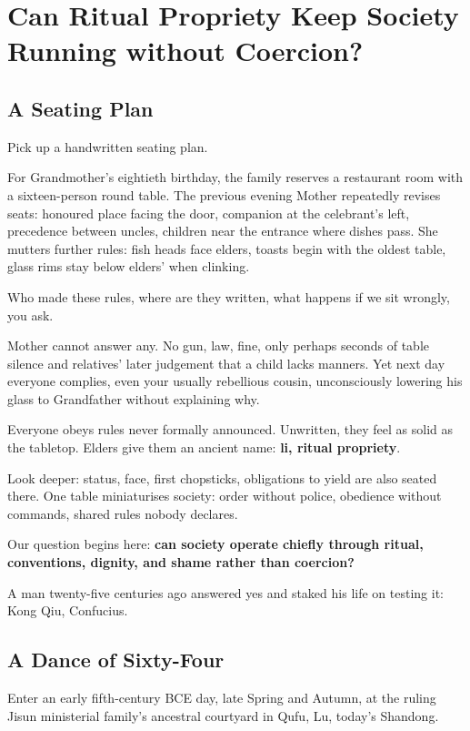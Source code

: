 \chapter[Can Ritual Sustain Unforced Order?]{Can Ritual Propriety Keep Society Running without Coercion?}
\section{A Seating Plan}
Pick up a handwritten seating plan.

For Grandmother's eightieth birthday, the family reserves a restaurant room with a sixteen-person round table. The previous evening Mother repeatedly revises seats: honoured place facing the door, companion at the celebrant's left, precedence between uncles, children near the entrance where dishes pass. She mutters further rules: fish heads face elders, toasts begin with the oldest table, glass rims stay below elders' when clinking.

Who made these rules, where are they written, what happens if we sit wrongly, you ask.

Mother cannot answer any. No gun, law, fine, only perhaps seconds of table silence and relatives' later judgement that a child lacks manners. Yet next day everyone complies, even your usually rebellious cousin, unconsciously lowering his glass to Grandfather without explaining why.

Everyone obeys rules never formally announced. Unwritten, they feel as solid as the tabletop. Elders give them an ancient name: \textbf{li, ritual propriety}.

Look deeper: status, face, first chopsticks, obligations to yield are also seated there. One table miniaturises society: order without police, obedience without commands, shared rules nobody declares.

Our question begins here: \textbf{can society operate chiefly through ritual, conventions, dignity, and shame rather than coercion?}

A man twenty-five centuries ago answered yes and staked his life on testing it: Kong Qiu, Confucius.

\section{A Dance of Sixty-Four}
Enter an early fifth-century BCE day, late Spring and Autumn, at the ruling Jisun ministerial family's ancestral courtyard in Qufu, Lu, today's Shandong.

